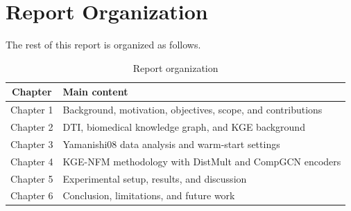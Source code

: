 \section{Report Organization}

The rest of this report is organized as follows.

\begin{table}[H]
\centering
\caption{Report organization}
\label{tab:report_organization}
\begin{tabular}{cl}
\toprule
\textbf{Chapter} & \textbf{Main content} \\
\midrule
Chapter 1 & Background, motivation, objectives, scope, and contributions \\
Chapter 2 & DTI, biomedical knowledge graph, and KGE background \\
Chapter 3 & Yamanishi08 data analysis and warm-start settings \\
Chapter 4 & KGE-NFM methodology with DistMult and CompGCN encoders \\
Chapter 5 & Experimental setup, results, and discussion \\
Chapter 6 & Conclusion, limitations, and future work \\
\bottomrule
\end{tabular}
\end{table}

